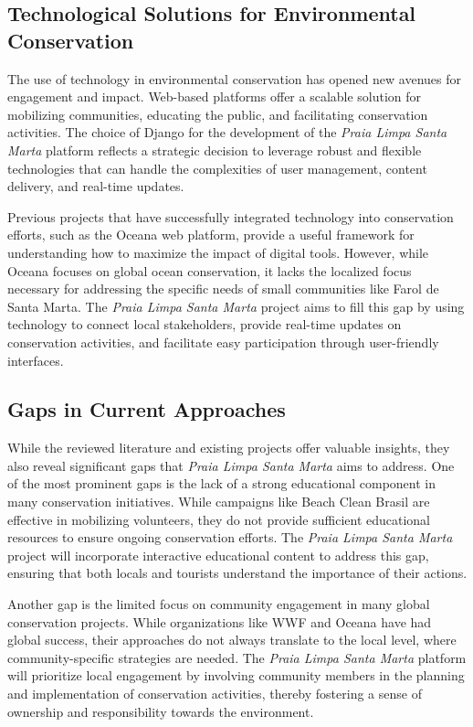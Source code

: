 \subsection{Technological Solutions for Environmental Conservation}

The use of technology in environmental conservation has opened new avenues for engagement and impact. Web-based platforms offer a scalable solution for mobilizing communities, educating the public, and facilitating conservation activities. The choice of Django for the development of the \textit{Praia Limpa Santa Marta} platform reflects a strategic decision to leverage robust and flexible technologies that can handle the complexities of user management, content delivery, and real-time updates.

Previous projects that have successfully integrated technology into conservation efforts, such as the Oceana\cite{oceana} web platform, provide a useful framework for understanding how to maximize the impact of digital tools. However, while Oceana focuses on global ocean conservation, it lacks the localized focus necessary for addressing the specific needs of small communities like Farol de Santa Marta. The \textit{Praia Limpa Santa Marta} project aims to fill this gap by using technology to connect local stakeholders, provide real-time updates on conservation activities, and facilitate easy participation through user-friendly interfaces.

\subsection{Gaps in Current Approaches}

While the reviewed literature and existing projects offer valuable insights, they also reveal significant gaps that \textit{Praia Limpa Santa Marta} aims to address. One of the most prominent gaps is the lack of a strong educational component in many conservation initiatives. While campaigns like Beach Clean Brasil\cite{beachcleanbrasil} are effective in mobilizing volunteers, they do not provide sufficient educational resources to ensure ongoing conservation efforts. The \textit{Praia Limpa Santa Marta} project will incorporate interactive educational content to address this gap, ensuring that both locals and tourists understand the importance of their actions.

Another gap is the limited focus on community engagement in many global conservation projects. While organizations like WWF and Oceana have had global success, their approaches do not always translate to the local level, where community-specific strategies are needed. The \textit{Praia Limpa Santa Marta} platform will prioritize local engagement by involving community members in the planning and implementation of conservation activities, thereby fostering a sense of ownership and responsibility towards the environment.

